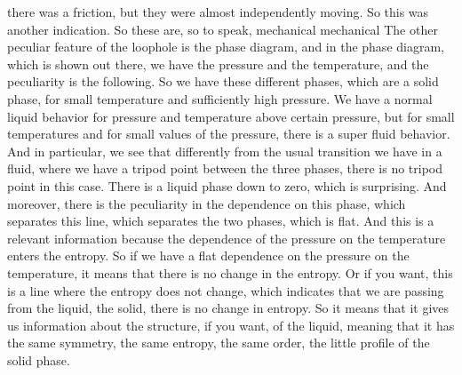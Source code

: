 there was a friction, but they were almost independently moving. So this was another indication. So these are, so to speak, mechanical mechanical The other peculiar feature of the loophole is the phase diagram, and in the phase diagram, which is shown out there, we have the pressure and the temperature, and the peculiarity is the following. So we have these different phases, which are a solid phase, for small temperature and sufficiently high pressure. We have a normal liquid behavior for pressure and temperature above certain pressure, but for small temperatures and for small values of the pressure, there is a super fluid behavior. And in particular, we see that differently from the usual transition we have in a fluid, where we have a tripod point between the three phases, there is no tripod point in this case. There is a liquid phase down to zero, which is surprising. And moreover, there is the peculiarity in the dependence on this phase, which separates this line, which separates the two phases, which is flat. And this is a relevant information because the dependence of the pressure on the temperature enters the entropy. So if we have a flat dependence on the pressure on the temperature, it means that there is no change in the entropy. Or if you want, this is a line where the entropy does not change, which indicates that we are passing from the liquid, the solid, there is no change in entropy. So it means that it gives us information about the structure, if you want, of the liquid, meaning that it has the same symmetry, the same entropy, the same order, the little profile of the solid phase.
